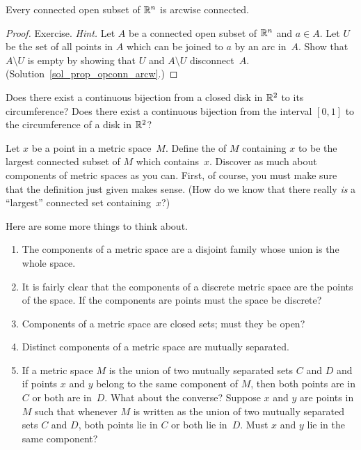 \begin{prop}\label{prop_opconn_arcw} Every connected open subset of $\mathbb{R}^n$ is arcwise connected.
\end{prop}

\begin{proof} Exercise. \emph{Hint.}  Let $A$ be a connected open subset of $\mathbb{R}^n$ and
$a \in A$.  Let $U$ be the set of all points in $A$ which can be joined to $a$ by an arc
in~$A$.  Show that $A \setminus U$ is empty by showing that $U$ and $A \setminus U$
disconnect~$A$.   (Solution~\ref{sol_prop_opconn_arcw}.) \ns
\end{proof}

\begin{prob} Does there exist a continuous bijection from a closed disk in $\mathbb{R}^2$ to its
circumference?  Does there exist a continuous bijection from the interval $[0,1]$ to the
circumference of a disk in $\mathbb{R}^2$?
\end{prob}

\begin{prob}  Let $x$ be a point in a metric space~$M$.  Define the
 of $M$ containing $x$ to be the largest connected subset of $M$ which
contains~$x$.  Discover as much about components of metric spaces as you can.  First, of
course, you must make sure that the definition just given makes sense.  (How do we know that
there really \emph{is} a ``largest'' connected set containing~$x$?)

Here are some more things to think about.
 \begin{enumerate}
  \item The components of a metric space are a disjoint family whose union is the whole space.
  \item It is fairly clear that the components of a discrete metric space are the points of
the space.  If the components are points must the space be discrete?
  \item Components of a metric space are closed sets;  must they be open?
  \item Distinct components of a metric space are mutually separated.
  \item If a metric space $M$ is the union of two mutually separated sets $C$ and $D$ and if
points $x$ and $y$ belong to the same component of $M$, then both points are in $C$ or both
are in~$D$. What about the converse?  Suppose $x$ and $y$ are points in $M$ such that whenever
$M$ is written as the union of two mutually separated sets $C$ and $D$, both points lie in $C$
or both lie in~$D$.  Must $x$ and $y$ lie in the same component?
 \end{enumerate}
\end{prob}

